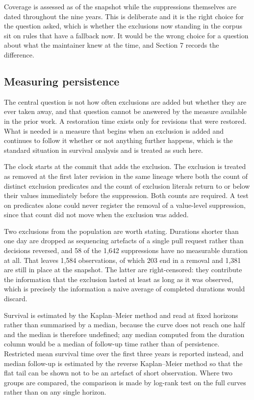 Coverage is assessed as of the snapshot while the suppressions themselves are dated throughout the nine years. This is deliberate and it is the right choice for the question asked, which is whether the exclusions now standing in the corpus sit on rules that have a fallback now. It would be the wrong choice for a question about what the maintainer knew at the time, and Section 7 records the difference.

\subsection{Measuring persistence}
\label{sec:persistence}

The central question is not how often exclusions are added but whether they are ever taken away, and that question cannot be answered by the measure available in the prior work. A restoration time exists only for revisions that were restored. What is needed is a measure that begins when an exclusion is added and continues to follow it whether or not anything further happens, which is the standard situation in survival analysis and is treated as such here.

The clock starts at the commit that adds the exclusion. The exclusion is treated as removed at the first later revision in the same lineage where both the count of distinct exclusion predicates and the count of exclusion literals return to or below their values immediately before the suppression. Both counts are required. A test on predicates alone could never register the removal of a value-level suppression, since that count did not move when the exclusion was added.

Two exclusions from the population are worth stating. Durations shorter than one day are dropped as sequencing artefacts of a single pull request rather than decisions reversed, and 58 of the 1,642 suppressions have no measurable duration at all. That leaves 1,584 observations, of which 203 end in a removal and 1,381 are still in place at the snapshot. The latter are right-censored: they contribute the information that the exclusion lasted at least as long as it was observed, which is precisely the information a naive average of completed durations would discard.

Survival is estimated by the Kaplan--Meier method and read at fixed horizons rather than summarised by a median, because the curve does not reach one half and the median is therefore undefined; any median computed from the duration column would be a median of follow-up time rather than of persistence. Restricted mean survival time over the first three years is reported instead, and median follow-up is estimated by the reverse Kaplan--Meier method so that the flat tail can be shown not to be an artefact of short observation. Where two groups are compared, the comparison is made by log-rank test on the full curves rather than on any single horizon.

